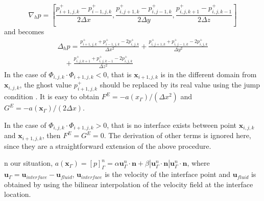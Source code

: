 \begin{equation} \label{ghostGradP} \nabla_h p =
[\frac{p^+_{i+1,j,k}-p^+_{i-1,j,k}}{2\Delta x},
\frac{p^+_{i,j+1,k}-p^+_{i,j-1,k}}{2\Delta y},
\frac{p^+_{i,j,k+1}-p^+_{i,j,k-1}}{2\Delta z}] \end{equation} and 
becomes
\begin{equation} \label{ghostLapP} 
\begin{aligned} \Delta_h p =
\frac{p^+_{i+1,j,k}+p^+_{i-1,j,k}-2p^+_{i,j,k}}{\Delta x^2} +
\frac{p^+_{i,j+1,k}+p^+_{i,j-1,k}-2p^+_{i,j,k}}{\Delta y^2} \\ \quad
+\frac{p^+_{i,j,k+1}+p^+_{i,j,k-1}-2p^+_{i,j,k}}{\Delta z^2} \end{aligned}
\end{equation}
In the case of $\Phi_{i,j,k} \cdot \Phi_{i+1,j,k} < 0$, that is
$\mathbf{x}_{i+1,j,k}$ is in the different domain from $\mathbf{x}_{i,j,k}$,
the ghost value $p^+_{i+1,j,k}$ should be replaced by its real value using the
jump condition . It is easy to obtain
$F^E = -a(x_{\Gamma})/(\Delta x^2)$ and $G^E = -a(\mathbf{x}_{\Gamma})/(2\Delta x)$.

In the case of $\Phi_{i,j,k}\cdot\Phi_{i+1,j,k} > 0$, that is no interface exists between point $\mathbf{x}_{i,j,k}$ and $\mathbf{x}_{i+1,j,k}$, then $F^E = G^E = 0$.  The derivation of other terms is ignored here, since they are a straightforward extension of the above procedure.

n our situation, $a(\mathbf{x}_{\Gamma}) = [p]^n_{\Gamma} = \alpha
\mathbf{u}_{\Gamma}^n\cdot \mathbf{n} + \beta|\mathbf{u}_{\Gamma}^n\cdot
\mathbf{n}| \mathbf{u}_{\Gamma}^n\cdot \mathbf{n}$, where $\mathbf{u}_{\Gamma} =
\mathbf{u}_{interface} - \mathbf{u}_{fluid}$, $\mathbf{u}_{interface}$ is the
velocity of the interface point and $\mathbf{u}_{fluid}$ is obtained by using
the bilinear interpolation of the velocity field at the interface location.


